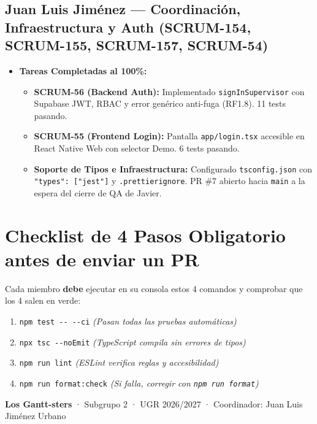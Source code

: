 \documentclass[10.5pt,a4paper]{article}
\begin{document}
\subsection{Juan Luis Jiménez --- Coordinación, Infraestructura y Auth (SCRUM-154, SCRUM-155, SCRUM-157, SCRUM-54)}
\begin{itemize}[leftmargin=*,itemsep=2pt]
    \item \textbf{Tareas Completadas al 100\%:}
    \begin{itemize}[leftmargin=*]
        \item \textbf{SCRUM-56 (Backend Auth):} Implementado \texttt{signInSupervisor} con Supabase JWT, RBAC y error genérico anti-fuga (RF1.8). 11 tests pasando.
        \item \textbf{SCRUM-55 (Frontend Login):} Pantalla \texttt{app/login.tsx} accesible en React Native Web con selector Demo. 6 tests pasando.
        \item \textbf{Soporte de Tipos e Infraestructura:} Configurado \texttt{tsconfig.json} con \texttt{"types": ["jest"]} y \texttt{.prettierignore}. PR \#7 abierto hacia \texttt{main} a la espera del cierre de QA de Javier.
    \end{itemize}
\end{itemize}

\section{Checklist de 4 Pasos Obligatorio antes de enviar un PR}

Cada miembro \textbf{debe} ejecutar en su consola estos 4 comandos y comprobar que los 4 salen en verde:

\begin{tcolorbox}[colback=ggray,colframe=gnavy,title=\textbf{Protocolo de Validación Local}]
\begin{enumerate}[leftmargin=*,itemsep=2pt]
    \item \texttt{npm test -{}- -{}-ci} \hfill \textit{(Pasan todas las pruebas automáticas)}
    \item \texttt{npx tsc -{}-noEmit} \hfill \textit{(TypeScript compila sin errores de tipos)}
    \item \texttt{npm run lint} \hfill \textit{(ESLint verifica reglas y accesibilidad)}
    \item \texttt{npm run format:check} \hfill \textit{(Si falla, corregir con \texttt{npm run format})}
\end{enumerate}
\end{tcolorbox}

\vspace{0.6cm}
\begin{center}
\small\textbf{Los Gantt-sters} · Subgrupo 2 · UGR 2026/2027 · Coordinador: Juan Luis Jiménez Urbano
\end{center}
\end{document}
